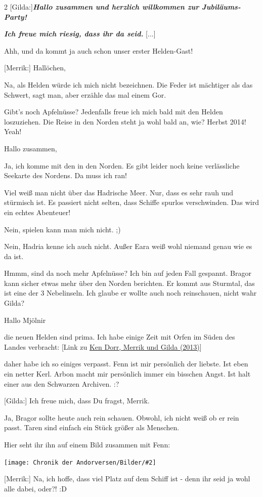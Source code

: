 \documentclass[10pt, a4paper, oneside]{book}
\newcommand{\refstorytext}[1]{\hyperref[Storytext: #1]{#1}}
\newcommand{\bildmitts}[2][height=0.32\textwidth,width=0.48\textwidth,keepaspectratio]{%
    \begin{center}
        \texttt{[image: Chronik der Andorversen/Bilder/\#2]}
    \end{center}
}
\begin{document}
\begin{multicols}{2}
[Gilda:]\textbf{\textit{Hallo zusammen und herzlich willkommen zur Jubiläums-Party!}}

\textit{\textbf{Ich freue mich riesig, dass ihr da seid.}} [...]

Ahh, und da kommt ja auch schon unser erster Helden-Gast!

[Merrik:] Hallöchen,

Na, als Helden würde ich mich nicht bezeichnen. Die Feder ist mächtiger als das Schwert, sagt man, aber erzähle das mal einem Gor.

Gibt's noch Apfelnüsse? Jedenfalls freue ich mich bald mit den Helden loszuziehen. Die Reise in den Norden steht ja wohl bald an, wie? Herbst 2014! Yeah!

Hallo zusammen,

Ja, ich komme mit den in den Norden. Es gibt leider noch keine verlässliche Seekarte des Nordens. Da muss ich ran!

Viel weiß man nicht über das Hadrische Meer. Nur, dass es sehr rauh und stürmisch ist. Es passiert nicht selten, dass Schiffe spurlos verschwinden. Das wird ein echtes Abenteuer!

Nein, spielen kann man mich nicht. ;)

Nein, Hadria kenne ich auch nicht. Außer Eara weiß wohl niemand genau wie es da ist.

Hmmm, sind da noch mehr Apfelnüsse? Ich bin auf jeden Fall gespannt. Bragor kann sicher etwas mehr über den Norden berichten. Er kommt aus Sturmtal, das ist eine der 3 Nebelinseln. Ich glaube er wollte auch noch reinschauen, nicht wahr Gilda?

Hallo Mjölnir

die neuen Helden sind prima. Ich habe einige Zeit mit Orfen im Süden des Landes verbracht: [Link zu \refstorytext{Ken Dorr, Merrik und Gilda (2013)}]

daher habe ich so einiges verpasst. Fenn ist mir persönlich der liebste. Ist eben ein netter Kerl. Arbon macht mir persönlich immer ein bisschen Angst. Ist halt einer aus den Schwarzen Archiven. :?


[Gilda:] Ich freue mich, dass Du fragst, Merrik.

Ja, Bragor sollte heute auch rein schauen. Obwohl, ich nicht weiß ob er rein passt. Taren sind einfach ein Stück größer als Menschen.

Hier seht ihr ihn auf einem Bild zusammen mit Fenn:

\bildmitts{Fenn Bragor.jpeg}

[Merrik:] Na, ich hoffe, dass viel Platz auf dem Schiff ist - denn ihr seid ja wohl alle dabei, oder?! :D


\end{multicols}
\end{document}

